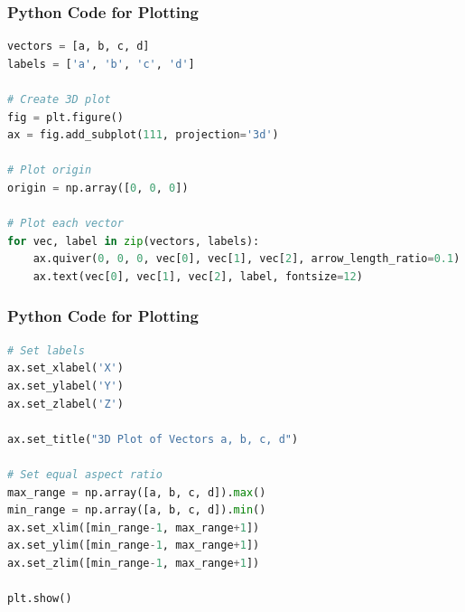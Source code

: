 \documentclass{beamer}
\theoremstyle{remark}
\numberwithin{equation}{section}
\begin{document}
\begin{frame}[fragile]
\frametitle{Python Code for Plotting}
\begin{lstlisting}[language=Python]
vectors = [a, b, c, d]
labels = ['a', 'b', 'c', 'd']

# Create 3D plot
fig = plt.figure()
ax = fig.add_subplot(111, projection='3d')

# Plot origin
origin = np.array([0, 0, 0])

# Plot each vector
for vec, label in zip(vectors, labels):
    ax.quiver(0, 0, 0, vec[0], vec[1], vec[2], arrow_length_ratio=0.1)
    ax.text(vec[0], vec[1], vec[2], label, fontsize=12)

\end{lstlisting}

\end{frame}
\begin{frame}[fragile]
\frametitle{Python Code for Plotting}
\begin{lstlisting}[language=Python]
# Set labels
ax.set_xlabel('X')
ax.set_ylabel('Y')
ax.set_zlabel('Z')

ax.set_title("3D Plot of Vectors a, b, c, d")

# Set equal aspect ratio
max_range = np.array([a, b, c, d]).max()
min_range = np.array([a, b, c, d]).min()
ax.set_xlim([min_range-1, max_range+1])
ax.set_ylim([min_range-1, max_range+1])
ax.set_zlim([min_range-1, max_range+1])

plt.show()



\end{lstlisting}

\end{frame}
\end{document}

